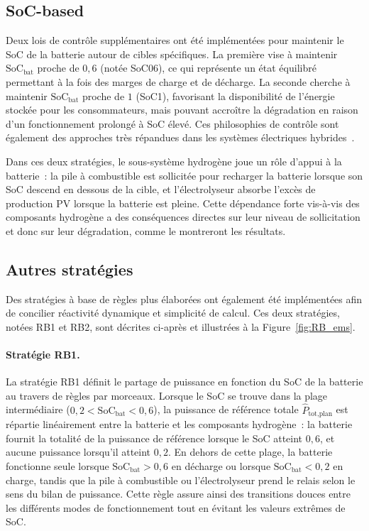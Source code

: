 \subsection{SoC-based}

Deux lois de contrôle supplémentaires ont été implémentées pour maintenir le SoC de la batterie autour de cibles spécifiques. La première vise à maintenir $\text{SoC}_{\text{bat}}$ proche de $0{,}6$ (notée SoC06), ce qui représente un état équilibré permettant à la fois des marges de charge et de décharge. La seconde cherche à maintenir $\text{SoC}_{\text{bat}}$ proche de $1$ (SoC1), favorisant la disponibilité de l'énergie stockée pour les consommateurs, mais pouvant accroître la dégradation en raison d'un fonctionnement prolongé à SoC élevé. Ces philosophies de contrôle sont également des approches très répandues dans les systèmes électriques hybrides~\cite{sorrentino_real-time_2021}\cite{zou_real-time_2023}.

Dans ces deux stratégies, le sous-système hydrogène joue un rôle d'appui à la batterie~: la pile à combustible est sollicitée pour recharger la batterie lorsque son SoC descend en dessous de la cible, et l'électrolyseur absorbe l'excès de production PV lorsque la batterie est pleine. Cette dépendance forte vis-à-vis des composants hydrogène a des conséquences directes sur leur niveau de sollicitation et donc sur leur dégradation, comme le montreront les résultats.

\subsection{Autres stratégies}

Des stratégies à base de règles plus élaborées ont également été implémentées afin de concilier réactivité dynamique et simplicité de calcul. Ces deux stratégies, notées RB1 et RB2, sont décrites ci-après et illustrées à la Figure~\ref{fig:RB_ems}.

\paragraph{Stratégie RB1.}
La stratégie RB1 définit le partage de puissance en fonction du SoC de la batterie au travers de règles par morceaux. Lorsque le SoC se trouve dans la plage intermédiaire ($0{,}2 < \text{SoC}_{\text{bat}} < 0{,}6$), la puissance de référence totale $\hat{P}_{\text{tot,plan}}$ est répartie linéairement entre la batterie et les composants hydrogène~: la batterie fournit la totalité de la puissance de référence lorsque le SoC atteint $0{,}6$, et aucune puissance lorsqu'il atteint $0{,}2$. En dehors de cette plage, la batterie fonctionne seule lorsque $\text{SoC}_{\text{bat}} > 0{,}6$ en décharge ou lorsque $\text{SoC}_{\text{bat}} < 0{,}2$ en charge, tandis que la pile à combustible ou l'électrolyseur prend le relais selon le sens du bilan de puissance. Cette règle assure ainsi des transitions douces entre les différents modes de fonctionnement tout en évitant les valeurs extrêmes de SoC.

